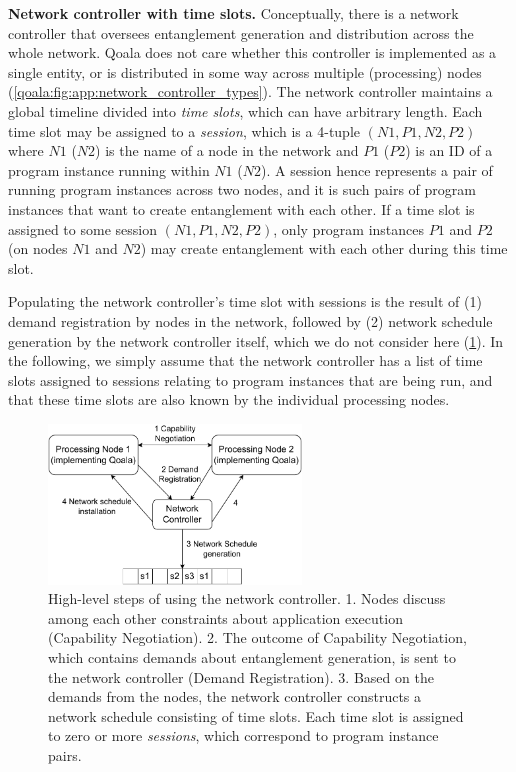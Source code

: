\textbf{Network controller with time slots.}
Conceptually, there is a network controller that oversees entanglement generation and distribution across the whole network.
Qoala does not care whether this controller is implemented as a single entity, or is distributed in some way across multiple (processing) nodes (\cref{qoala:fig:app:network_controller_types}).
The network controller maintains a global timeline divided into \textit{time slots}, which can have arbitrary length.
Each time slot may be assigned to a \textit{session}, which is a 4-tuple $(N1, P1, N2, P2)$ where $N1$ ($N2$) is the name of a node in the network and $P1$ ($P2$) is an ID of a program instance running within $N1$ ($N2$).
A session hence represents a pair of running program instances across two nodes, and it is such pairs of program instances that want to create entanglement with each other. 
If a time slot is assigned to some session $(N1, P1, N2, P2)$, only program instances $P1$ and $P2$ (on nodes $N1$ and $N2$) may create entanglement with each other during this time slot.

Populating the network controller's time slot with sessions is the result of (1) demand registration by nodes in the network, followed by (2) network schedule generation by the network controller itself, which we do not consider here (\cref{qoala:fig:app:network_controller_setup}).
In the following, we simply assume that the network controller has a list of time slots assigned to sessions relating to program instances that are being run, and that these time slots are also known by the individual processing nodes.

\begin{figure}[t]
    \centering
    \includegraphics[width=0.6\textwidth]{figures/qoala/network_controller_setup.pdf}
    \caption{High-level steps of using the network controller.
    1. Nodes discuss among each other constraints about application execution (Capability Negotiation).
    2. The outcome of Capability Negotiation, which contains demands about entanglement generation, is sent to the network controller (Demand Registration).
    3. Based on the demands from the nodes, the network controller constructs a network schedule consisting of time slots. Each time slot is assigned to zero or more \textit{sessions}, which correspond to program instance pairs.
    }
    \label{qoala:fig:app:network_controller_setup}
\end{figure}

